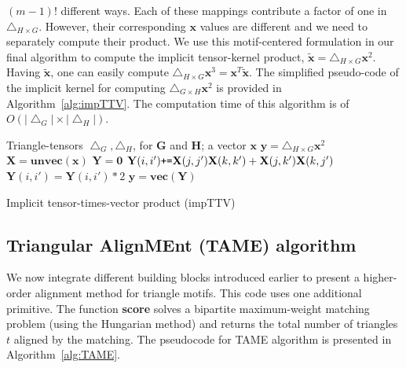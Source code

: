 \documentclass[10pt, journal, compsoc, final]{IEEEtran}
\newcommand{\bs}[1]{\boldsymbol{#1}}
\newcommand{\Vector}[1]{\bs{#1}}
\newcommand{\Matrix}[1]{\mathbf{#1}}
\newcommand{\Tensor}[1]{\mathbf{\mathcal{#1}}}
\newcommand{\Graph}[1]{\mathit{\mathbf{\bs{#1}}}}
\newcommand{\Set}[1]{\mathit{#1}}
\begin{document}
$(m-1)!$ different ways. Each of these mappings contribute a factor of one in 
$\Tensor{\bigtriangleup}_{H \times G}$. However, their corresponding $\Vector{x}$ values are 
different and we need to separately compute their product. We use this motif-centered formulation 
in our final algorithm to compute the implicit tensor-kernel product, $\tilde{\Vector{x}} = 
\Tensor{\bigtriangleup}_{H \times G}\Vector{x}^{2}$. Having $\tilde{\Vector{x}}$, one can easily 
compute $\Tensor{\bigtriangleup}_{H \times G}\Vector{x}^{3} = \Vector{x}^{T}\tilde{\Vector{x}}$. 
The simplified pseudo-code of the implicit kernel for computing $\Tensor{\bigtriangleup}_{G \times 
H}\Vector{x}^{2}$ is provided in Algorithm~\ref{alg:impTTV}. The computation time of this algorithm is of $O(|{\bigtriangleup}_G|\times|{\bigtriangleup}_H|)$.

\begin{algorithm}
\centering
\begin{algorithmic}[1]
\REQUIRE  Triangle-tensors ${\bigtriangleup}_G, \Tensor{\bigtriangleup}_H$,  for $\Graph{G}$ and $\Graph{H}$; a vector $\Vector{x}$
\ENSURE $\Vector{y} = \Tensor{\bigtriangleup}_{H \times G}\Vector{x}^{2}$
\STATE $\Matrix{X} = \textbf{unvec}(\Vector{x})$
\STATE $\Matrix{Y} = \Matrix{0}$
		\FOR{$	\{ (j, k) \in \Set{N}_{\bigtriangleup_G}(i) \}$}
			\FOR{$	\{ (j', k') \in \Set{N}_{\bigtriangleup_H}(i') \}$}		
				\STATE $\Matrix{Y}(i, i') \mbox{\texttt{+=}} \Matrix{X}(j, j')\Matrix{X}(k, k') + \Matrix{X}(j, k')\Matrix{X}(k, j')$		
			\ENDFOR
		\ENDFOR
		\STATE $\Matrix{Y}(i, i') = \Matrix{Y}(i, i')*2$
	\ENDFOR
\ENDFOR
\STATE $\Vector{y} = \textbf{vec}(\Matrix{Y})$
\end{algorithmic}
\caption{Implicit tensor-times-vector product (impTTV)}
\label{alg:impTTV}
\end{algorithm}



\subsection{Triangular AlignMEnt (TAME) algorithm}
\label{sec:TAME_alg}

We now integrate different building blocks introduced earlier to present a 
higher-order alignment method for triangle motifs. This code uses
one additional primitive. The function \textbf{score} solves a
bipartite maximum-weight matching problem (using the Hungarian
method) and returns the total number of 
triangles $t$ aligned by the matching. The pseudocode for TAME 
algorithm is presented in Algorithm~\ref{alg:TAME}. 
\end{document}
